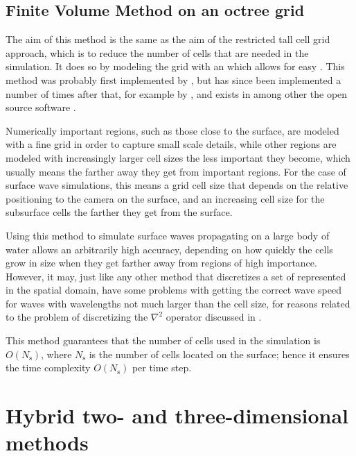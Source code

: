 \subsection{Finite Volume Method on an octree grid}

The aim of this method is the same as the aim of the restricted tall cell grid approach, which is to reduce the number of cells that are needed in the simulation. It does so by modeling the grid with an \octree which allows for easy . This method was probably first implemented by \citet{Popinet2003}, but has since been implemented a number of times after that, for example by \citet{Losasso2004}, and exists in among other the open source software \OpenFOAM.

Numerically important regions, such as those close to the surface, are modeled with a fine grid in order to capture small scale details, while other regions are modeled with increasingly larger cell sizes the less important they become, which usually means the farther away they get from important regions. For the case of surface wave simulations, this means a grid cell size that depends on the relative positioning to the camera on the surface, and an increasing cell size for the subsurface cells the farther they get from the surface.

Using this method to simulate surface waves propagating on a large body of water allows an arbitrarily high accuracy, depending on how quickly the cells grow in size when they get farther away from regions of high importance. However, it may, just like any other method that discretizes a set of \PDEs represented in the spatial domain, have some problems with getting the correct wave speed for waves with wavelengths not much larger than the cell size, for reasons related to the problem of discretizing the $\nabla^2$ operator discussed in .

This method guarantees that the number of cells used in the simulation is $O(N_{\text{s}})$, where $N_{\text{s}}$ is the number of cells located on the surface; hence it ensures the time complexity $O(N_{\text{s}})$ per time step.

\section{Hybrid two- and three-dimensional methods}

